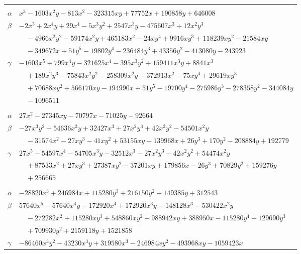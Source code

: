 \documentclass[11pt]{article}
\begin{document}
\begin{longtable}{@{}ll@{}}
\addlinespace[3pt]
\multicolumn{2}{@{}l}{$\{i,j\}=\{87,126\}$, $k_{ij}=2^{4}\cdot 19^{3}$}\\
$\alpha$ & $x^{3}-1603x^{2}y-813x^{2}-323315xy+77752x+190858y+646008$\\
$\beta$ & $-2x^{5}+2x^{4}y+29x^{4}-5x^{3}y^{2}+2547x^{3}y-475607x^{3}+12x^{2}y^{3}$\\
 & $\quad -4966x^{2}y^{2}-59174x^{2}y+465183x^{2}-24xy^{4}+9916xy^{3}+118239xy^{2}-21584xy$\\
 & $\quad -349672x+51y^{5}-19802y^{4}-236484y^{3}+43356y^{2}-413080y-243923$\\
$\gamma$ & $-1603x^{5}+799x^{4}y-321625x^{4}-395x^{3}y^{2}+159411x^{3}y+8841x^{3}$\\
 & $\quad +189x^{2}y^{3}-75843x^{2}y^{2}-258309x^{2}y-372913x^{2}-75xy^{4}+29619xy^{3}$\\
 & $\quad +70688xy^{2}+566170xy-194990x+51y^{5}-19700y^{4}-275986y^{3}-278358y^{2}-344084y$\\
 & $\quad -1096511$\\
\addlinespace[3pt]
\multicolumn{2}{@{}l}{$\{i,j\}=\{87,131\}$, $k_{ij}=2^{5}\cdot 3\cdot 5\cdot 7\cdot 13$}\\
$\alpha$ & $27x^{2}-27345xy-70797x-71025y-92664$\\
$\beta$ & $-27x^{3}y^{2}+54636x^{3}y+32427x^{3}+27x^{2}y^{3}+42x^{2}y^{2}-54501x^{2}y$\\
 & $\quad -31574x^{2}-27xy^{3}-41xy^{2}+53155xy+139968x+26y^{3}+170y^{2}-208884y+192779$\\
$\gamma$ & $27x^{5}-54597x^{4}-54705x^{3}y-32512x^{3}-27x^{2}y^{3}-42x^{2}y^{2}+54474x^{2}y$\\
 & $\quad +87533x^{2}+27xy^{3}+27387xy^{2}-37201xy+179856x-26y^{3}+70829y^{2}+159276y$\\
 & $\quad +256665$\\
\addlinespace[3pt]
\multicolumn{2}{@{}l}{$\{i,j\}=\{87,142\}$, $k_{ij}=2^{4}\cdot 3^{2}\cdot 7^{2}\cdot 13$}\\
$\alpha$ & $-28820x^{3}+246984x+115280y^{3}+216150y^{2}+149385y+312543$\\
$\beta$ & $57640x^{5}-57640x^{4}y-172920x^{4}+172920x^{3}y-148128x^{3}-530422x^{2}y$\\
 & $\quad -272282x^{2}+115280xy^{3}+548860xy^{2}+988942xy+388950x-115280y^{4}+129690y^{3}$\\
 & $\quad +709930y^{2}+2159118y+1521858$\\
$\gamma$ & $-86460x^{3}y^{2}-43230x^{3}y+319580x^{3}-246984xy^{2}-493968xy-1059423x$\\

\end{longtable}
\end{document}
